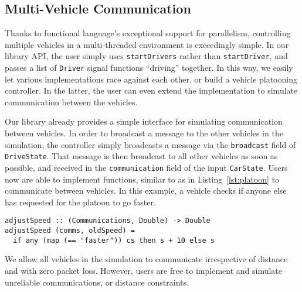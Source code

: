 \subsection{Multi-Vehicle Communication}

Thanks to functional language's exceptional support for parallelism, controlling multiple vehicles in a multi-threaded environment is exceedingly simple. 
In our library API, the user simply uses \texttt{startDrivers} rather than \texttt{startDriver}, and passes a list of \texttt{Driver} signal functions ``driving'' together.
In this way, we easily let various implementations race against each other, or build a vehicle platooning controller.
In the latter, the user can even extend the implementation to simulate communication between the vehicles.

Our library already provides a simple interface for simulating communication between vehicles.
In order to broadcast a message to the other vehicles in the simulation, the controller simply broadcasts a message via the \texttt{broadcast} field of \texttt{DriveState}.
That message is then broadcast to all other vehicles as soon as possible, and received in the \texttt{communication} field of the input \texttt{CarState}.
Users now are able to implement functions, similar to as in Listing~\ref{lst:platoon} to communicate between vehicles.
In this example, a vehicle checks if anyone else has requested for the platoon to go faster.

\begin{lstlisting}[float,floatplacement=T,caption=Communicating between controllers, label=lst:platoon]
adjustSpeed :: (Communications, Double) -> Double
adjustSpeed (comms, oldSpeed) =
  if any (map (== "faster")) cs then s + 10 else s
\end{lstlisting}

We allow all vehicles in the simulation to communicate irrespective of distance and with zero packet loss.
However, users are free to implement and simulate unreliable communications, or distance constraints.  

